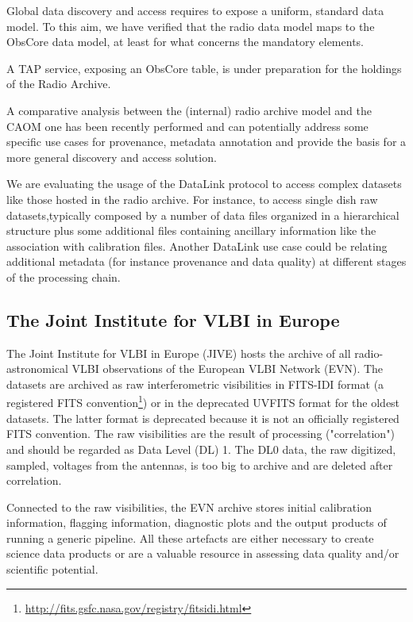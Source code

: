 \documentclass[11pt,a4paper]{ivoa}
\begin{document}
Global data discovery and access requires to expose a uniform, standard data model. To this aim, we have verified that the radio data model maps to the ObsCore data model, at least  for what concerns the mandatory elements.

A TAP service, exposing an ObsCore table, is under preparation for the holdings of the Radio Archive.

A comparative analysis between the (internal) radio archive model and the CAOM one has been recently performed and can potentially address some specific use cases for provenance, metadata annotation and provide the basis for a more general discovery and access solution.

We are evaluating the usage of the DataLink protocol to access complex datasets like those hosted in the radio archive. For instance, to access single dish raw datasets,typically composed by a number of data files organized in a hierarchical structure plus some additional files containing ancillary information like the association with calibration files. Another DataLink use case could be relating additional metadata (for instance provenance and data quality) at different stages of the processing chain.

\subsection{The Joint Institute for VLBI in Europe}
\label{sec:JIVE}
The Joint Institute for VLBI in Europe (JIVE) hosts the archive of all radio-astronomical VLBI observations of the European VLBI Network (EVN). The datasets are archived as raw interferometric visibilities in FITS-IDI format (a registered FITS convention\footnote{\url{ http://fits.gsfc.nasa.gov/registry/fitsidi.html}}) or in the deprecated UVFITS format for the oldest datasets. The latter format is deprecated because it is not an officially registered FITS convention. The raw visibilities are the result of processing ("correlation") and should be regarded as Data Level (DL) 1. The DL0 data, the raw digitized, sampled, voltages from the antennas, is too big to archive and are deleted after correlation.

Connected to the raw visibilities, the EVN archive stores initial calibration information, flagging information, diagnostic plots and the output products of running a generic pipeline. All these artefacts are either necessary to create science data products or are a valuable resource in assessing data quality and/or scientific potential.
\end{document}
